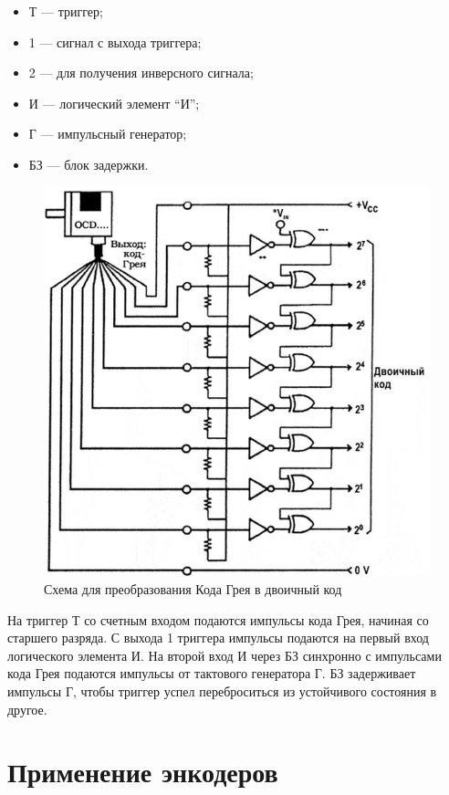 \begin{itemize}
    \item Т --- триггер;
    \item 1 --- сигнал с выхода триггера;
    \item 2 --- для получения инверсного сигнала;
    \item И --- логический элемент ``И'';
    \item Г --- импульсный генератор;
    \item БЗ --- блок задержки.
\end{itemize}

\begin{figure}[ht]
    \includegraphics[width=1\linewidth]{Figures/complexchanger.png}
    \caption{Схема для преобразования Кода Грея в двоичный код}
    \label{fig:complexchanger}
\end{figure}

На триггер Т со счетным входом подаются импульсы кода Грея, начиная со старшего разряда. С выхода 1 триггера импульсы подаются на первый вход логического элемента И. На второй вход И через БЗ синхронно с импульсами кода Грея подаются импульсы от тактового генератора Г. БЗ задерживает импульсы Г, чтобы триггер успел переброситься из устойчивого состояния в другое.

\section{Применение энкодеров}

